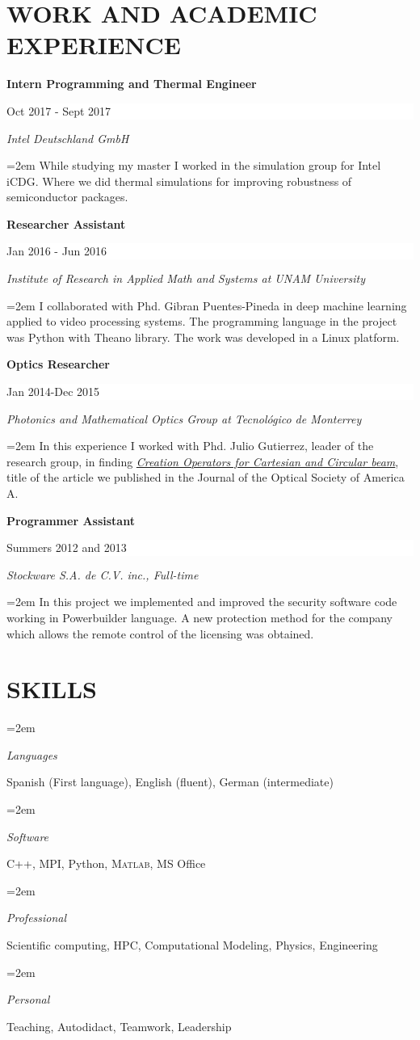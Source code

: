 \documentclass[paper=a4,fontsize=11pt]{scrartcl} %
\newlength{\spacebox}
\newcommand{\sepspace}{\vspace*{1em}}		%
\newcommand{\NewPart}[1]{\section*{\uppercase{#1}}}
\newcommand{\PersonalEntry}[2]{
		\noindent\hangindent=2em\hangafter=0 %
		\parbox{\spacebox}{        %
		\textit{#1}}		       %
		\hspace{2em} #2 \par}    %
\newcommand{\SkillsEntry}[2]{      %
		\noindent\hangindent=2em\hangafter=0 %
		\parbox{\spacebox}{        %
		\textit{#1}}			   %
		\hspace{2em} #2 \par}    %
\newcommand{\EducationEntry}[4]{
		\noindent \textbf{#1} \hfill      %
		\colorbox{white}{%
			\parbox{15em}{%
			\hfill\color{black}#2}} \par  %
		\noindent \textit{#3} \par        %
		\noindent\hangindent=2em\hangafter=0 \small #4 %
		\normalsize \par}
\begin{document}
\NewPart{Work and Academic experience}{}

\EducationEntry{Intern Programming and Thermal Engineer}{Oct 2017 - Sept 2017}{Intel Deutschland GmbH}{While studying my master I worked in the simulation group for Intel iCDG. Where we did thermal simulations for improving robustness of semiconductor packages.}
\sepspace

\EducationEntry{Researcher Assistant}{Jan 2016 - Jun 2016}{Institute of Research in Applied  Math and Systems at UNAM University}{I collaborated with Phd. Gibran Puentes-Pineda in deep machine learning applied to video processing systems. The programming language in the project was Python with Theano library. The work was developed in a Linux platform. }
\sepspace

\EducationEntry{Optics Researcher}{Jan 2014-Dec 2015}{Photonics and Mathematical Optics Group at Tecnológico de Monterrey}{In this experience I worked with Phd. Julio Gutierrez, leader of the research group, in finding \href{https://www.osapublishing.org/josaa/abstract.cfm?uri=josaa-33-5-832}{ \textit{Creation Operators for Cartesian and Circular beam}}, title of the article we published in the Journal of the Optical Society of America A.}
\sepspace

\EducationEntry{Programmer Assistant}{Summers 2012 and 2013}{Stockware S.A. de C.V. inc., Full-time}{In this project we implemented and improved the security software code working in Powerbuilder language. A new protection method for the company which allows the remote control of the licensing was obtained.}
\sepspace


\NewPart{Skills}{}

\SkillsEntry{Languages}{Spanish (First language), English (fluent), German (intermediate)}
\SkillsEntry{Software}{C++, MPI, Python, \textsc{Matlab}, MS Office}
\SkillsEntry{Professional}{Scientific computing, HPC, 	Computational Modeling, Physics,  Engineering}
\SkillsEntry{Personal}{Teaching, Autodidact, Teamwork, Leadership}
\end{document}

